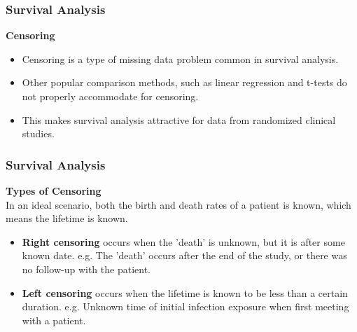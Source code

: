 	\begin{frame}
		\frametitle{Survival Analysis}
		\noindent \textbf{Censoring}	\\ \smallskip
		
		
		\begin{itemize}
			\item Censoring is a type of missing data problem common in survival analysis. 
			\item Other popular comparison methods, such as linear regression and t-tests do not properly accommodate for censoring. 
			\item This makes survival analysis attractive for data from randomized clinical studies.
			
		\end{itemize}
		
	\end{frame}
	\begin{frame}
		\frametitle{Survival Analysis}
		\noindent \textbf{Types of Censoring}	\\ \smallskip
		In an ideal scenario, both the birth and death rates of a patient is known, which means the lifetime is known.
		\begin{itemize}
			\item \textbf{Right censoring} occurs when the 'death' is unknown, but it is after some known date. e.g. The 'death' occurs after the end of the study, or there was no follow-up with the patient.
			\item \textbf{Left censoring} occurs when the lifetime is known to be less than a certain duration. e.g. Unknown time of initial infection exposure when first meeting with a patient.
		\end{itemize}
	\end{frame}
	
